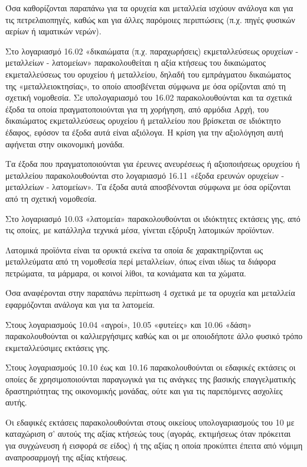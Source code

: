 \documentclass[A4,10pt,greek]{book}
\begin{document}
Όσα καθορίζονται παραπάνω για τα ορυχεία και μεταλλεία ισχύουν ανάλογα και για τις πετρελαιοπηγές, καθώς και για άλλες παρόμοιες περιπτώσεις (π.χ. πηγές φυσικών αερίων ή ιαματικών νερών).

Στο λογαριασμό 16.02 «δικαιώματα (π.χ. παραχωρήσεις) εκμεταλλεύσεως ορυχείων - μεταλλείων - λατομείων» παρακολουθείται η αξία κτήσεως του δικαιώματος εκμεταλλεύσεως του ορυχείου ή μεταλλείου, δηλαδή του εμπράγματου δικαιώματος της «μεταλλειοκτησίας», το οποίο αποσβένεται σύμφωνα με όσα ορίζονται από τη σχετική νομοθεσία. Σε υπολογαριασμό του 16.02 παρακολουθούνται και τα σχετικά έξοδα τα οποία πραγματοποιούνται για τη χορήγηση, από αρμόδια Αρχή, του δικαιώματος εκμεταλλεύσεως ορυχείου ή μεταλλείου που βρίσκεται σε ιδιόκτητο έδαφος, εφόσον τα έξοδα αυτά είναι αξιόλογα. Η κρίση για την αξιολόγηση αυτή αφήνεται στην οικονομική μονάδα.

Τα έξοδα που πραγματοποιούνται για έρευνες ανευρέσεως ή αξιοποιήσεως ορυχείου ή μεταλλείου παρακολουθούνται στο λογαριασμό 16.11 «έξοδα ερευνών ορυχείων - μεταλλείων - λατομείων». Τα έξοδα αυτά αποσβένονται σύμφωνα με όσα ορίζονται από τη σχετική νομοθεσία.

Στο λογαριασμό 10.03 «λατομεία» παρακολουθούνται οι ιδιόκτητες εκτάσεις γης, από τις οποίες, με κατάλληλα τεχνικά μέσα, γίνεται εξόρυξη λατομικών προϊόντων.

Λατομικά προϊόντα είναι τα ορυκτά εκείνα τα οποία δε χαρακτηρίζονται ως μεταλλεύματα από τη νομοθεσία περί μεταλλείων, όπως είναι ιδίως τα διάφορα πετρώματα, τα μάρμαρα, οι κοινοί λίθοι, τα κονιάματα και τα χώματα.

Όσα αναφέρονται στην παραπάνω περίπτωση 4 σχετικά με τα ορυχεία και μεταλλεία εφαρμόζονται ανάλογα και για τα λατομεία.

Στους λογαριασμούς 10.04 «αγροί», 10.05 «φυτείες» και 10.06 «δάση» παρακολουθούνται οι καλλιεργήσιμες καθώς και οι με οποιοδήποτε άλλο φυσικό τρόπο εκμεταλλεύσιμες εκτάσεις γης.

Στους λογαριασμούς 10.10 έως και 10.16 παρακολουθούνται οι εδαφικές εκτάσεις οι οποίες δε χρησιμοποιούνται παραγωγικά για τις ανάγκες της βασικής επαγγελματικής δραστηριότητας της οικονομικής μονάδας, ούτε και για τις παρεπόμενες ασχολίες αυτής.

Οι εδαφικές εκτάσεις παρακολουθούνται στους οικείους υπολογαριασμούς του 10 με καταχώριση σ' αυτούς της αξίας κτήσεώς τους (αγοράς, εκτιμήσεως όταν πρόκειται για συγχώνευση ή εισφορά σε είδος) ή της αξίας η οποία προκύπτει έπειτα από νόμιμη αναπροσαρμογή της αξίας κτήσεως.
\end{document}
